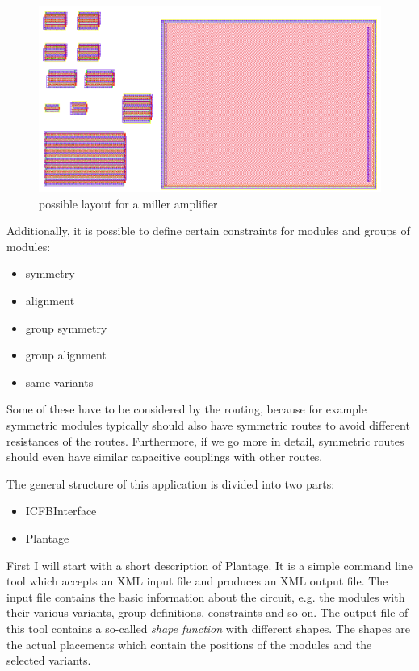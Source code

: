 \begin{figure}
	\centering
	\includegraphics[scale=0.4]{FIG/miller_amplifier_layout.png}
	\caption{possible layout for a miller amplifier}
	\label{fig:miller_amplifier_layout}
\end{figure}

Additionally, it is possible to define certain constraints for modules and groups of modules:

\begin{itemize}
\item symmetry
\item alignment
\item group symmetry
\item group alignment
\item same variants
\end{itemize}

Some of these have to be considered by the routing, because for example symmetric modules typically should also have symmetric routes to avoid different resistances of the routes. Furthermore, if we go more in detail, symmetric routes should even have similar capacitive couplings with other routes.

The general structure of this application is divided into two parts:
\begin{itemize}
\item ICFBInterface
\item Plantage
\end{itemize}

First I will start with a short description of Plantage. It is a simple command line tool which accepts an XML input file and produces an XML output file. The input file contains the basic information about the circuit, e.g. the modules with their various variants, group definitions, constraints and so on. The output file of this tool contains a so-called \emph{shape function} with different shapes. The shapes are the actual placements which contain the positions of the modules and the selected variants.

